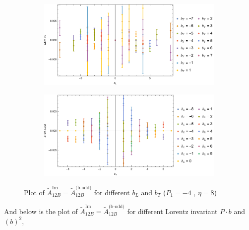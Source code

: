 \documentclass[]{article}
\numberwithin{equation}{section}
\newcommand{\tAmp}{\widetilde{A}}
\newcommand{\tAmp}{\ensuremath{\widetilde{A}^{(+)}}}
\begin{document}
\begin{figure}[h!]
     \centering
     \begin{subfigure}[b]{0.45\textwidth}
         \centering
         \includegraphics[width=\textwidth]{Amp_plots/bL_A12B_b_odd_P1_-4_eta_8.pdf}
     \end{subfigure}
     \begin{subfigure}[b]{0.45\textwidth}
         \centering
         \includegraphics[width=\textwidth]{Amp_plots/bT_A12B_b_odd_P1_-4_eta_8.pdf}
     \end{subfigure}
        \caption{Plot of  $\tAmp^{\text{Im}}_{12B}=\tAmp^{\text{(b-odd)}}_{12B}$ for different $b_{L}$ and $b_{T}$  ($P_{1} = -4$ , $\eta=8$)}
\end{figure}
\pagebreak
And below is the plot of $\tAmp^{\text{Im}}_{12B}=\tAmp^{\text{(b-odd)}}_{12B}$ for different Lorentz invariant $P\cdot b$ and $(b)^2$,
\end{document}
